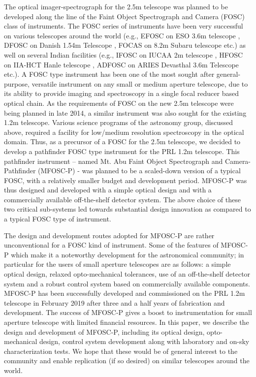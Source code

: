 The optical imager-spectrograph for the 2.5m telescope was planned to be developed along the line of the Faint Object Spectrograph and Camera (FOSC) class of instruments. The FOSC series of instruments have been very successful on various telescopes around the world (e.g., EFOSC on ESO 3.6m telescope \citep{Buzzoni1984}, DFOSC on Danish 1.54m Telescope \citep{Andersen1995}, FOCAS on 8.2m Subaru telescope \citep{Kashikawa2000} etc.) as well on several Indian facilities (e.g., IFOSC on IUCAA 2m telescope \citep{Gupta2002}, HFOSC on IIA-HCT Hanle telescope \citep{Prabhu2010},  ADFOSC on ARIES Devasthal 3.6m Telescope \citep{Kumar2016, Omar2017} etc.). A FOSC type instrument has been one of the most sought after general-purpose, versatile instrument on any small or medium aperture telescope, due to its ability to provide imaging and spectroscopy in a single focal reducer based optical chain.  As the requirements of FOSC on the new 2.5m telescope were being planned in late 2014, a similar instrument was also sought for the existing 1.2m telescope. Various science programs of the astronomy group, discussed above, required a facility for low/medium resolution spectroscopy in the optical domain. Thus, as a precursor of a FOSC for the 2.5m telescope, we decided to develop a pathfinder FOSC type instrument for the PRL 1.2m telescope. This pathfinder instrument – named Mt. Abu Faint Object Spectrograph and Camera-Pathfinder (MFOSC-P) - was planned to be a scaled-down version of a typical FOSC, with a relatively smaller budget and development period. MFOSC-P was thus designed and developed with a simple optical design and with a commercially available off-the-shelf detector system. The above choice of these two critical sub-systems led towards substantial design innovation as compared to a typical FOSC type of instrument.
\par 
The design and development routes adopted for MFOSC-P are rather unconventional for a FOSC kind of instrument. Some of the features of MFOSC-P which make it a noteworthy development for the astronomical community; in particular for the users of small aperture telescopes are as follows: a simple optical design, relaxed opto-mechanical tolerances, use of an off-the-shelf detector system and a robust control system based on commercially available components. MFOSC-P has been successfully developed and commissioned on the PRL 1.2m telescope in February 2019 after three and a half years of fabrication and development. The success of MFOSC-P gives a boost to instrumentation for small aperture telescope with limited financial resources. In this paper, we describe the design and development of MFOSC-P, including its optical design, opto-mechanical design, control system development along with laboratory and on-sky characterization tests. We hope that these would be of general interest to the community and enable replication (if so desired) on similar telescopes around the world.

